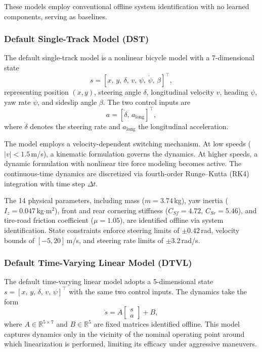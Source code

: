 These models employ conventional offline system identification with no learned components, serving as baselines.

\subsubsection{Default Single-Track Model (DST)}
\label{sec:dst}

The default single-track model is a nonlinear bicycle model with a 7-dimensional state
\begin{equation}
  s = [x,\, y,\, \delta,\, v,\, \psi,\, \dot{\psi},\, \beta]^\top,
\end{equation}
representing position $(x, y)$, steering angle $\delta$, longitudinal velocity $v$, heading $\psi$, yaw rate $\dot{\psi}$, and sideslip angle $\beta$. The two control inputs are
\begin{equation}
  a = [\dot{\delta},\, a_{\text{long}}]^\top,
\end{equation}
where $\dot{\delta}$ denotes the steering rate and $a_{\text{long}}$ the longitudinal acceleration.

The model employs a velocity-dependent switching mechanism. At low speeds ($|v| < 1.5$\,m/s), a kinematic formulation governs the dynamics. At higher speeds, a dynamic formulation with nonlinear tire force modeling becomes active. The continuous-time dynamics are discretized via fourth-order Runge--Kutta (RK4) integration with time step $\Delta t$.

The 14 physical parameters, including mass ($m = 3.74$\,kg), yaw inertia ($I_z = 0.047$\,kg$\cdot$m$^2$), front and rear cornering stiffness ($C_{Sf} = 4.72$, $C_{Sr} = 5.46$), and tire-road friction coefficient ($\mu = 1.05$), are identified offline via system identification. State constraints enforce steering limits of $\pm 0.42$\,rad, velocity bounds of $[-5, 20]$\,m/s, and steering rate limits of $\pm 3.2$\,rad/s.

\subsubsection{Default Time-Varying Linear Model (DTVL)}
\label{sec:dtvl}

The default time-varying linear model adopts a 5-dimensional state $s = [x,\, y,\, \delta,\, v,\, \psi]^\top$ with the same two control inputs. The dynamics take the form
\begin{equation}
  \dot{s} = A \begin{bmatrix} s \\ a \end{bmatrix} + B,
  \label{eq:tvl}
\end{equation}
where $A \in \mathbb{R}^{5 \times 7}$ and $B \in \mathbb{R}^{5}$ are fixed matrices identified offline. This model captures dynamics only in the vicinity of the nominal operating point around which linearization is performed, limiting its efficacy under aggressive maneuvers.

